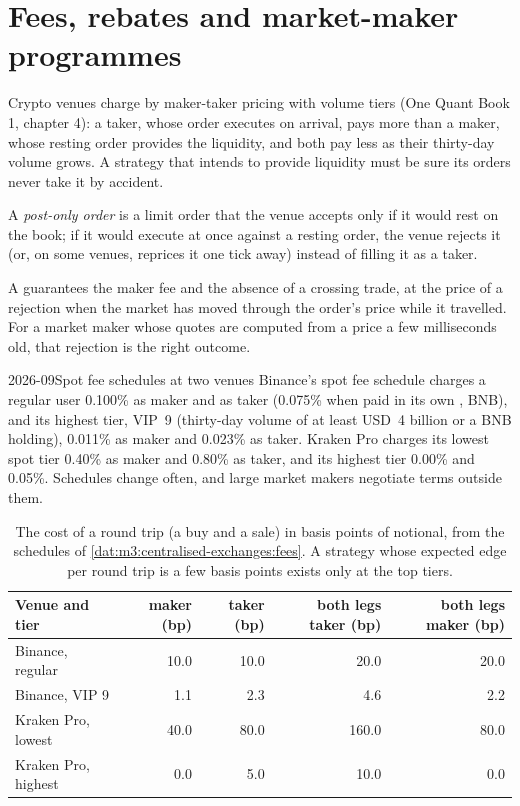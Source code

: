 \section{Fees, rebates and market-maker programmes}

Crypto venues charge by maker-taker pricing with volume tiers (One Quant Book 1, chapter 4): a taker,
whose order executes on arrival, pays more than a maker, whose resting order provides the liquidity, and
both pay less as their thirty-day volume grows. A strategy that intends to provide liquidity must be sure
its orders never take it by accident.

\begin{definition}\label{def:m3:centralised-exchanges:postonly}
A \emph{post-only order} is a limit order that the venue accepts only if it would
rest on the book; if it would execute at once against a resting order, the venue rejects it (or, on
some venues, reprices it one tick away) instead of filling it as a taker.
\end{definition}

A  guarantees the maker fee and the absence of a crossing trade, at the price of a
rejection when the market has moved through the order's price while it travelled. For a market maker
whose quotes are computed from a price a few milliseconds old, that rejection is the right outcome.

\begin{dated}{2026-09}{Spot fee schedules at two venues}\label{dat:m3:centralised-exchanges:fees}
Binance's spot fee schedule charges a regular user 0.100\% as maker and as taker (0.075\% when paid in
its own , BNB), and its highest tier, VIP~9 (thirty-day volume of at least USD~4 billion or a BNB
holding), 0.011\% as maker and 0.023\% as taker. Kraken Pro charges its lowest spot tier 0.40\% as maker
and 0.80\% as taker, and its highest tier 0.00\% and 0.05\%. Schedules change often, and large market
makers negotiate terms outside them.
\end{dated}

\begin{table}[ht]
\centering
\small
\begin{tabular}{@{}lrrrr@{}}
\toprule
Venue and tier & maker (bp) & taker (bp) & both legs taker (bp) & both legs maker (bp) \\
\midrule
Binance, regular & 10.0 & 10.0 & 20.0 & 20.0 \\
Binance, VIP 9 & 1.1 & 2.3 & 4.6 & 2.2 \\
Kraken Pro, lowest & 40.0 & 80.0 & 160.0 & 80.0 \\
Kraken Pro, highest & 0.0 & 5.0 & 10.0 & 0.0 \\
\bottomrule
\end{tabular}
\caption{The cost of a round trip (a buy and a sale) in basis points of notional, from the schedules of
\cref{dat:m3:centralised-exchanges:fees}. A strategy whose expected edge per round trip is a few basis
points exists only at the top tiers.}\label{tab:m3:centralised-exchanges:fees}
\end{table}

